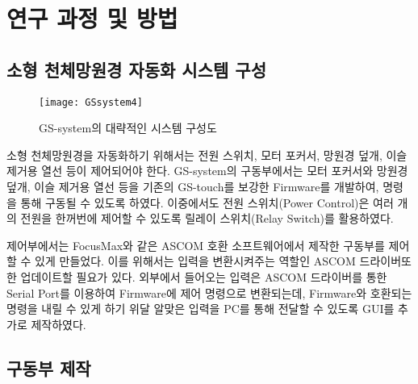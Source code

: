 
\section{연구 과정 및 방법}


\subsection{소형 천체망원경 자동화 시스템 구성}




\begin{figure}[h]
	\begin{center}
		\texttt{[image: GSsystem4]}
	\end{center}
	\caption{GS-system의 대략적인 시스템 구성도}
	\label{GSsystem}
\end{figure}

소형 천체망원경을 자동화하기 위해서는 전원 스위치, 모터 포커서, 망원경 덮개, 이슬 제거용 열선 등이  제어되어야 한다. GS-system의 구동부에서는 모터 포커서와 망원경 덮개, 이슬 제거용 열선 등을 기존의 GS-touch를 보강한 Firmware를 개발하여, 명령을 통해 구동될 수 있도록 하였다. 이중에서도 전원 스위치(Power Control)은 여러 개의 전원을 한꺼번에 제어할 수 있도록 릴레이 스위치(Relay Switch)를 활용하였다.

제어부에서는 FocusMax와 같은 ASCOM 호환 소프트웨어에서 제작한 구동부를 제어할 수 있게 만들었다. 이를  위해서는 입력을 변환시켜주는 역할인 ASCOM 드라이버또한 업데이트할 필요가 있다. 외부에서 들어오는 입력은 ASCOM 드라이버를 통한 Serial Port를 이용하여 Firmware에 제어 명령으로 변환되는데, Firmware와 호환되는 명령을 내릴 수 있게 하기 위달 알맞은 입력을 PC를 통해 전달할 수 있도록 GUI를 추가로 제작하였다.



\subsection{구동부 제작}

